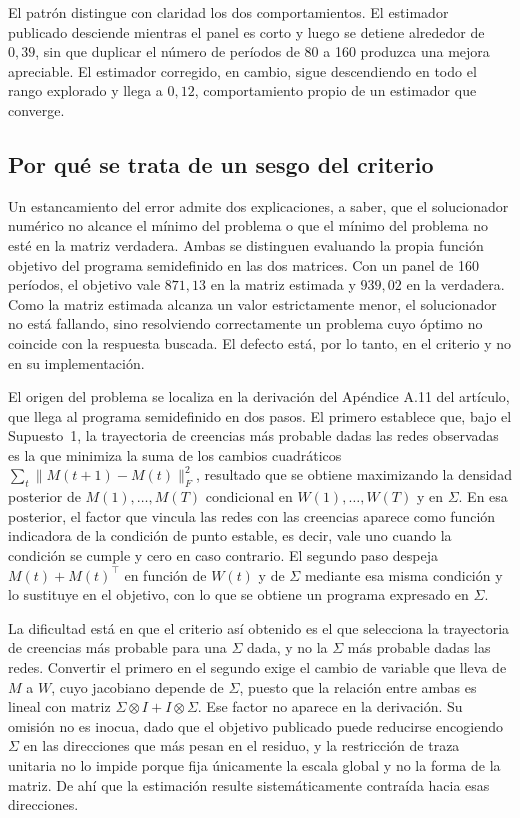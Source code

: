 El patrón distingue con claridad los dos comportamientos. El estimador publicado
desciende mientras el panel es corto y luego se detiene alrededor de $0{,}39$,
sin que duplicar el número de períodos de 80 a 160 produzca una mejora
apreciable. El estimador corregido, en cambio, sigue descendiendo en todo el
rango explorado y llega a $0{,}12$, comportamiento propio de un estimador que
converge.

\subsection{Por qué se trata de un sesgo del criterio}
\label{anexo:auditoria-causa}

Un estancamiento del error admite dos explicaciones, a saber, que el
solucionador numérico no alcance el mínimo del problema o que el mínimo del
problema no esté en la matriz verdadera. Ambas se distinguen evaluando la propia
función objetivo del programa semidefinido en las dos matrices. Con un panel de
160 períodos, el objetivo vale $871{,}13$ en la matriz estimada y $939{,}02$ en
la verdadera. Como la matriz estimada alcanza un valor estrictamente menor, el
solucionador no está fallando, sino resolviendo correctamente un problema cuyo
óptimo no coincide con la respuesta buscada. El defecto está, por lo tanto, en
el criterio y no en su implementación.

El origen del problema se localiza en la derivación del Apéndice A.11 del
artículo, que llega al programa semidefinido en dos pasos. El primero establece
que, bajo el Supuesto~1, la trayectoria de creencias más probable dadas las
redes observadas es la que minimiza la suma de los cambios cuadráticos
$\sum_t \|M(t+1)-M(t)\|_F^2$, resultado que se obtiene maximizando la densidad
posterior de $M(1),\dots,M(T)$ condicional en $W(1),\dots,W(T)$ y en $\Sigma$. En
esa posterior, el factor que vincula las redes con las creencias aparece como
función indicadora de la condición de punto estable, es decir, vale uno cuando la
condición se cumple y cero en caso contrario. El segundo paso despeja
$M(t)+M(t)^\top$ en función de $W(t)$ y de $\Sigma$ mediante esa misma condición
y lo sustituye en el objetivo, con lo que se obtiene un programa expresado en
$\Sigma$.

La dificultad está en que el criterio así obtenido es el que selecciona la
trayectoria de creencias más probable para una $\Sigma$ dada, y no la $\Sigma$
más probable dadas las redes. Convertir el primero en el segundo exige el cambio
de variable que lleva de $M$ a $W$, cuyo jacobiano depende de $\Sigma$, puesto
que la relación entre ambas es lineal con matriz $\Sigma\otimes I + I\otimes\Sigma$.
Ese factor no aparece en la derivación. Su omisión no es inocua, dado que el
objetivo publicado puede reducirse encogiendo $\Sigma$ en las direcciones que
más pesan en el residuo, y la restricción de traza unitaria no lo impide porque
fija únicamente la escala global y no la forma de la matriz. De ahí que la
estimación resulte sistemáticamente contraída hacia esas direcciones.

